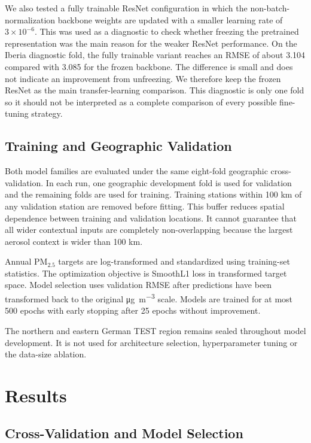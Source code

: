 \documentclass[english, a4paper]{article}
\begin{document}
We also tested a fully trainable ResNet configuration in which the non-batch-normalization backbone weights are updated with a smaller learning rate of $3\times10^{-6}$. This was used as a diagnostic to check whether freezing the pretrained representation was the main reason for the weaker ResNet performance. On the Iberia diagnostic fold, the fully trainable variant reaches an RMSE of about 3.104 compared with 3.085 for the frozen backbone. The difference is small and does not indicate an improvement from unfreezing. We therefore keep the frozen ResNet as the main transfer-learning comparison. This diagnostic is only one fold so it should not be interpreted as a complete comparison of every possible fine-tuning strategy.


\subsection{Training and Geographic Validation}
\label{sec:model_training}

Both model families are evaluated under the same eight-fold geographic cross-validation. In each run, one geographic development fold is used for validation and the remaining folds are used for training. Training stations within 100 km of any validation station are removed before fitting. This buffer reduces spatial dependence between training and validation locations. It cannot guarantee that all wider contextual inputs are completely non-overlapping because the largest aerosol context is wider than 100 km.

Annual PM$_{2.5}$ targets are log-transformed and standardized using training-set statistics. The optimization objective is SmoothL1 loss in transformed target space. Model selection uses validation RMSE after predictions have been transformed back to the original \si{\micro\gram\per\cubic\meter} scale. Models are trained for at most 500 epochs with early stopping after 25 epochs without improvement.

The northern and eastern German TEST region remains sealed throughout model development. It is not used for architecture selection, hyperparameter tuning or the data-size ablation.


\section{Results}
\label{sec:results}

\subsection{Cross-Validation and Model Selection}
\label{sec:cv_results}
\end{document}
